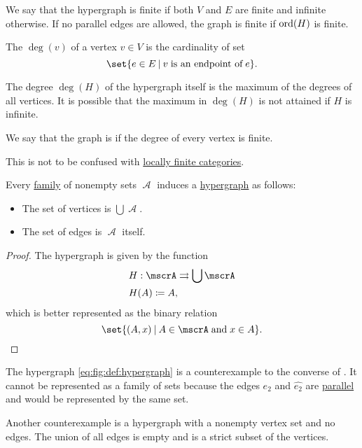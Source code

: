 \begin{definition}
\begin{thmenum}
    We say that the hypergraph is finite if both \( V \) and \( E \) are finite and infinite otherwise. If no parallel edges are allowed, the graph is finite if \( \operatorname{ord}(H) \) is finite.

     The  \( \deg(v) \) of a vertex \( v \in V \) is the cardinality of set
    \begin{equation*}
      \set{ e \in E \given v \T{is an endpoint of} e }.
    \end{equation*}

    The degree \( \deg(H) \) of the hypergraph itself is the maximum of the degrees of all vertices. It is possible that the maximum in \( \deg(H) \) is not attained if \( H \) is infinite.

    We say that the graph is  if the degree of every vertex is finite.

    This is not to be confused with \hyperref[def:category_size]{locally finite categories}.
  \end{thmenum}
\end{definition}

\begin{proposition}\label{thm:family_of_sets_induces_hypergraph}
  Every \hyperref[rem:family_of_sets]{family} of nonempty sets \( \mscrA \) induces a \hyperref[def:hypergraph]{hypergraph} as follows:
  \begin{itemize}
    \item The set of vertices is \( \bigcup \mscrA \).
    \item The set of edges is \( \mscrA \) itself.
  \end{itemize}
\end{proposition}
\begin{proof}
  The hypergraph is given by the function
  \begin{equation*}
    \begin{aligned}
      &H: \mscrA \multto \bigcup \mscrA \\
      &H(A) \coloneqq A,
    \end{aligned}
  \end{equation*}
  which is better represented as the binary relation
  \begin{equation*}
    \set{ (A, x) \given A \in \mscrA \T{and} x \in A }.
  \end{equation*}
\end{proof}

\begin{example}\label{ex:hypergraphs_not_induced_by_family}
  The hypergraph \eqref{eq:fig:def:hypergraph} is a counterexample to the converse of . It cannot be represented as a family of sets because the edges \( e_2 \) and \( \widehat{e_2} \) are \hyperref[def:hypergraph/parallel_edges]{parallel} and would be represented by the same set.

  Another counterexample is a hypergraph with a nonempty vertex set and no edges. The union of all edges is empty and is a strict subset of the vertices.
\end{example}

